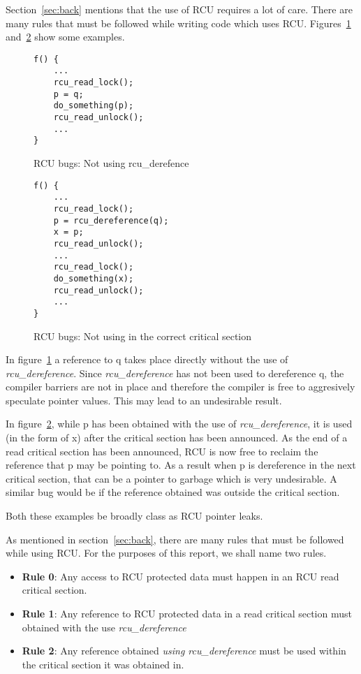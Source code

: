 Section~\ref{sec:back} mentions that the use of RCU requires a lot of care. 
There are many rules that must be followed while writing code
which uses RCU. Figures~\ref{fig:rcuderefbug} and~\ref{fig:rcuusebug} show
some examples.

\begin{figure}[h]
\centering
\begin{lstlisting}
f() {
	...
	rcu_read_lock();
	p = q;
	do_something(p);
	rcu_read_unlock();
	...
}
\end{lstlisting}
\caption{RCU bugs: Not using rcu\_derefence}\label{fig:rcuderefbug}
\end{figure}

\begin{figure}[h]
\centering
\begin{lstlisting}
f() {
	...
	rcu_read_lock();
	p = rcu_dereference(q);
	x = p;
	rcu_read_unlock();
	...
	rcu_read_lock();
	do_something(x);
	rcu_read_unlock();
	...
}
\end{lstlisting}
\caption{RCU bugs: Not using in the correct critical section}\label{fig:rcuusebug}
\end{figure}

In figure~\ref{fig:rcuderefbug} a reference to q takes place directly without the use
of \emph{rcu\_dereference}. Since \emph{rcu\_dereference} has not been used to
dereference q, the compiler barriers are not in place and therefore the compiler
is free to aggresively speculate pointer values. This may lead to an undesirable
result.

In figure~\ref{fig:rcuusebug}, while p has been obtained with the
use of \emph{rcu\_dereference}, it is used (in the form of x) after the critical section
has been announced. As the end of a read critical section has been announced,
RCU is now free to reclaim the reference that p may be pointing to. As a result
when p is dereference in the next critical section, that can be a pointer to
garbage which is very undesirable.  A similar bug would be if the reference
obtained was outside the critical section.

Both these examples be broadly class as RCU pointer leaks.

As mentioned in section~\ref{sec:back}, there are many rules that must be followed
while using RCU. For the purposes of this report, we shall name two rules.
\begin{itemize}
\item{\bf Rule 0}: Any access to RCU protected data must happen in an RCU read critical section.
\item{\bf Rule 1}: Any reference to RCU protected data in a read critical section must obtained with the use \emph{rcu\_dereference}
\item{\bf Rule 2}: Any reference obtained \emph{using rcu\_dereference} must be used within the critical section it was obtained in.
\end{itemize}

